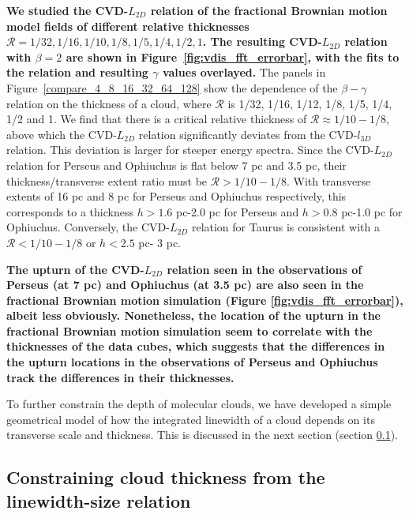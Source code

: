 \documentclass[iop,revtex4]{emulateapj}
\begin{document}
{\bf We studied the CVD-$L_{2D}$ relation of the fractional Brownian motion model fields of different relative thicknesses $\mathcal{R}=1/32, 1/16, 1/10, 1/8, 1/5, 1/4, 1/2, 1$. The resulting CVD-$L_{2D}$ relation with $\beta=2$ are shown in Figure~\ref{fig:vdis_fft_errorbar}, with the fits to the relation and resulting $\gamma$ values overlayed.} The panels in Figure~\ref{compare_4_8_16_32_64_128} show the dependence of the $\beta-\gamma$ relation on the thickness of a cloud, where $\mathcal{R}$ is
1/32, 1/16, 1/12, 1/8, 1/5, 1/4, 1/2 and 1. We find that there is a critical
relative thickness of $\mathcal{R}\approx 1/10 - 1/8$, above which the
CVD-$L_{2D}$ relation significantly deviates from the CVD-$l_{3D}$ relation.
This deviation is larger for steeper energy spectra. Since the
CVD-$L_{2D}$ relation for Perseus and Ophiuchus is flat below
7 pc and 3.5 pc, their thickness/transverse extent ratio must be
$\mathcal{R}> 1/10 - 1/8$. With transverse extents of 16 pc and 8 pc for
Perseus and Ophiuchus respectively, this corresponds to a thickness $h>1.6$ pc-2.0 pc for
Perseus and $h>0.8$ pc-1.0 pc for Ophiuchus. Conversely, the CVD-$L_{2D}$
relation for Taurus is consistent with a $\mathcal{R}<1/10-1/8$ or $h<2.5$ pc-
3 pc.

{\bf The upturn of the CVD-$L_{2D}$ relation seen in the observations of Perseus (at 7 pc) and Ophiuchus (at 3.5 pc) are also seen in the fractional Brownian motion simulation (Figure \ref{fig:vdis_fft_errorbar}), albeit less obviously. Nonetheless, the location of the upturn in the fractional Brownian motion simulation seem to correlate with the thicknesses  of the data cubes, which suggests that the differences in the upturn locations in the observations of Perseus and Ophiuchus track the differences in their thicknesses.}

To further constrain the depth of molecular clouds, we have developed a simple geometrical model of how the integrated linewidth of a cloud depends on its transverse scale and thickness. This is discussed in the next section (section \ref{sec:size_linewidth}).


\subsection{Constraining cloud thickness from the linewidth-size relation}
\label{sec:size_linewidth}
\end{document}
